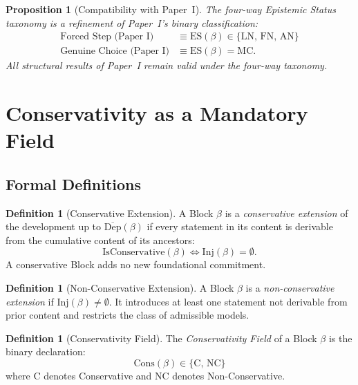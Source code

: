 \documentclass[12pt, a4paper]{article}
\theoremstyle{plain}
\newtheorem{proposition}[theorem]{Proposition}
\theoremstyle{definition}
\newtheorem{definition}[theorem]{Definition}
\theoremstyle{remark}
\newcommand{\Inj}[1]{\mathrm{Inj}(#1)}
\newcommand{\DC}[1]{\overline{\mathrm{Dep}}(#1)}
\newcommand{\ES}[1]{\mathrm{ES}(#1)}
\newcommand{\Cons}[1]{\mathrm{Cons}(#1)}
\newcommand{\LN}{\mathrm{LN}}
\newcommand{\FN}{\mathrm{FN}}
\newcommand{\AN}{\mathrm{AN}}
\newcommand{\MC}{\mathrm{MC}}
\newcommand{\C}{\mathrm{C}}
\newcommand{\NC}{\mathrm{NC}}
\begin{document}
\begin{proposition}[Compatibility with Paper~I]
\label{prop:es-compat}
The four-way Epistemic Status taxonomy is a refinement of Paper~I's
binary classification:
\begin{align*}
  \text{Forced Step (Paper I)} &\equiv \ES{\beta}
      \in \{\LN,\,\FN,\,\AN\} \\
  \text{Genuine Choice (Paper I)} &\equiv \ES{\beta} = \MC.
\end{align*}
All structural results of Paper~I remain valid under the four-way
taxonomy.
\end{proposition}

\section{Conservativity as a Mandatory Field}
\label{sec:cons}

\subsection{Formal Definitions}
\label{subsec:cons-defs}

\begin{definition}[Conservative Extension]
\label{def:conservative}
A Block $\beta$ is a \emph{conservative extension} of the development
up to $\DC{\beta}$ if every statement in its content is derivable
from the cumulative content of its ancestors:
\[
  \mathrm{IsConservative}(\beta)
  \iff
  \Inj{\beta} = \emptyset.
\]
A conservative Block adds no new foundational commitment.
\end{definition}

\begin{definition}[Non-Conservative Extension]
\label{def:nonconservative}
A Block $\beta$ is a \emph{non-conservative extension} if
$\Inj{\beta} \neq \emptyset$. It introduces at least one statement
not derivable from prior content and restricts the class of
admissible models.
\end{definition}

\begin{definition}[Conservativity Field]
\label{def:cons-field}
The \emph{Conservativity Field} of a Block $\beta$ is the binary
declaration:
\[
  \Cons{\beta} \in \{\C,\, \NC\}
\]
where $\C$ denotes Conservative and $\NC$ denotes Non-Conservative.
\end{definition}
\end{document}
